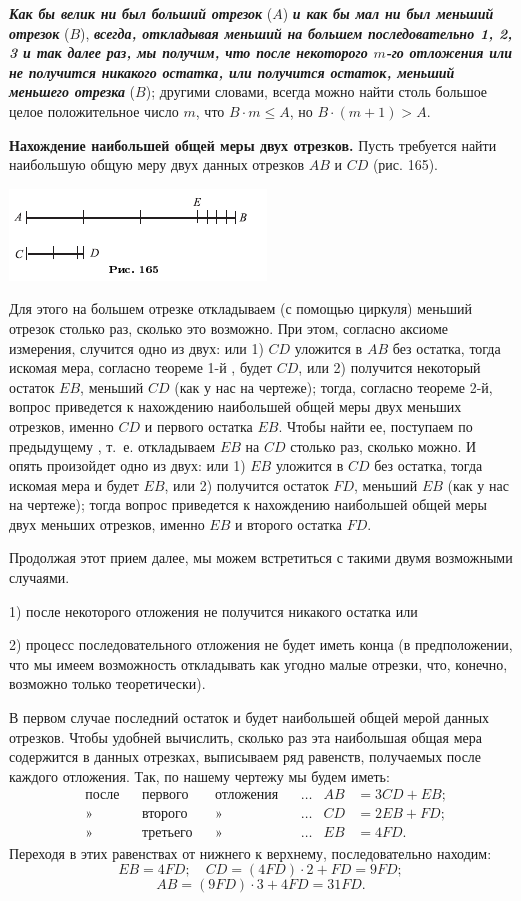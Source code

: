\documentclass[oneside]{book}
\begin{document}
\textbf{\emph{Как бы велик ни был больший отрезок}} ($A$) \textbf{\emph{и как бы мал ни был меньший отрезок}} ($B$), \textbf{\emph{всегда, откладывая меньший на большем последовательно 1, 2, 3 и так далее раз, мы получим, что после некоторого $m$-го отложения или не получится никакого остатка, или получится остаток, меньший меньшего отрезка}} ($B$);
другими словами, всегда можно найти столь большое целое положительное число $m$, что $B \cdot  m \le A$, но $B \cdot  (m + 1) > A$.

\textbf{Нахождение наибольшей общей меры двух отрезков.}
Пусть требуется найти наибольшую общую меру двух данных отрезков $AB$ и $CD$ (рис. 165).

\includegraphics{pics/ris-165}

Для этого на большем отрезке откладываем (с помощью циркуля) меньший отрезок столько раз, сколько это возможно.
При этом, согласно аксиоме измерения, случится одно из двух:
или 
1) $CD$ уложится в $AB$ без остатка, тогда искомая мера, согласно теореме 1-й%
, будет $CD$, 
или 2) получится некоторый остаток $EB$, меньший $CD$ (как у нас на чертеже);
тогда, согласно теореме 2-й, вопрос приведется к нахождению наибольшей общей меры двух меньших отрезков, именно $CD$ и первого остатка $EB$.
Чтобы найти ее, поступаем по предыдущему%
, т.~е. откладываем $EB$ на $CD$ столько раз, сколько можно.
И опять произойдет одно из двух:
или 1) $EB$ уложится в $CD$ без остатка, тогда искомая мера и будет $EB$, 
или 2) получится остаток $FD$, меньший $EB$ (как у нас на чертеже);
тогда вопрос приведется к нахождению наибольшей общей меры двух меньших отрезков, именно $EB$ и второго остатка $FD$.

Продолжая этот прием далее, мы можем встретиться с такими двумя возможными случаями.

1) после некоторого отложения не получится никакого остатка или

2) процесс последовательного отложения не будет иметь конца (в предположении, что мы имеем возможность откладывать как угодно малые отрезки, что, конечно, возможно только теоретически).

В первом случае последний остаток и будет наибольшей общей мерой данных отрезков.
Чтобы удобней вычислить, сколько раз эта наибольшая общая мера содержится в данных отрезках, выписываем ряд равенств, получаемых после каждого отложения.
Так, по нашему чертежу мы будем иметь:
\begin{align*}
&\text{после}
&&\text{первого}
&&\text{отложения}
&&\dots
&AB &= 3CD + EB;
\\
&\text{»}
&&\text{второго}
&&\text{»}
&&\dots
&CD &= 2EB + FD;
\\
&\text{»}
&&\text{третьего}
&&\text{»}
&&\dots
&EB &= 4FD.
\end{align*}
Переходя в этих равенствах от нижнего к верхнему, последовательно находим:
\[
EB=4FD;
\quad
CD=(4FD)\cdot 2+FD=9FD;
\]
\[
AB=(9FD)\cdot 3+4FD=31FD.
\]
\end{document}
